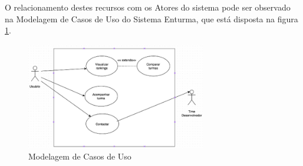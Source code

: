 	O relacionamento destes recursos com os Atores do sistema pode ser observado na Modelagem de Casos de Uso do Sistema Enturma, que está disposta na figura \ref{img:modelagem}.

	\begin{figure}[H]
		\centering
		\includegraphics[width=0.7\textwidth]{imagens/modelagem}
		\caption{Modelagem de Casos de Uso}
		\label{img:modelagem}
	\end{figure}

